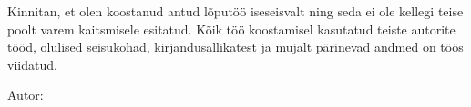 Kinnitan, et olen koostanud antud lõputöö iseseisvalt ning seda ei ole kellegi teise poolt varem kaitsmisele esitatud. Kõik töö koostamisel kasutatud teiste autorite tööd, olulised seisukohad, kirjandusallikatest ja mujalt pärinevad andmed on töös viidatud.

\begin{flushleft}

Autor:~\authorName\\
\vspace*{0.5cm}
\signatureDate
 
\end{flushleft}